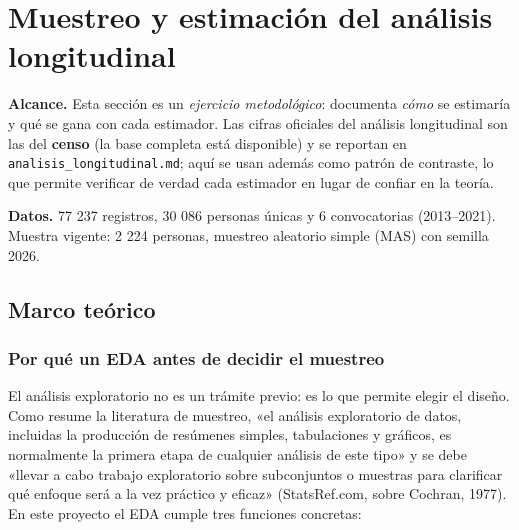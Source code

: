 %
%

\section{Muestreo y estimación del análisis longitudinal}
\label{sec:muestreo}

\textbf{Alcance.} Esta sección es un \emph{ejercicio metodológico}: documenta
\emph{cómo} se estimaría y qué se gana con cada estimador. Las cifras oficiales
del análisis longitudinal son las del \textbf{censo} (la base completa está
disponible) y se reportan en \texttt{analisis\_longitudinal.md}; aquí se usan
además como patrón de contraste, lo que permite verificar de verdad cada
estimador en lugar de confiar en la teoría.

\textbf{Datos.} 77 237 registros, 30 086 personas únicas y 6 convocatorias
(2013--2021). Muestra vigente: 2 224 personas, muestreo aleatorio simple (MAS)
con semilla 2026.

\subsection{Marco teórico}
\label{sec:mues-marco}

\subsubsection{Por qué un EDA antes de decidir el muestreo}

El análisis exploratorio no es un trámite previo: es lo que permite elegir el
diseño. Como resume la literatura de muestreo, «el análisis exploratorio de
datos, incluidas la producción de resúmenes simples, tabulaciones y gráficos, es
normalmente la primera etapa de cualquier análisis de este tipo» y se debe
«llevar a cabo trabajo exploratorio sobre subconjuntos o muestras para
clarificar qué enfoque será a la vez práctico y eficaz» (StatsRef.com, sobre
Cochran, 1977). En este proyecto el EDA cumple tres funciones concretas:

